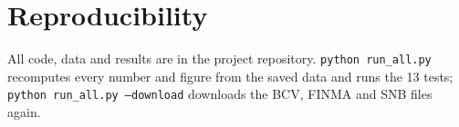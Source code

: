 \documentclass[11pt,a4paper]{article}
\begin{document}
\section*{Reproducibility}
All code, data and results are in the project repository. \texttt{python run\_all.py} recomputes every number and figure from the saved data and runs the 13 tests; \texttt{python run\_all.py --download} downloads the BCV, FINMA and SNB files again.



\end{document}
